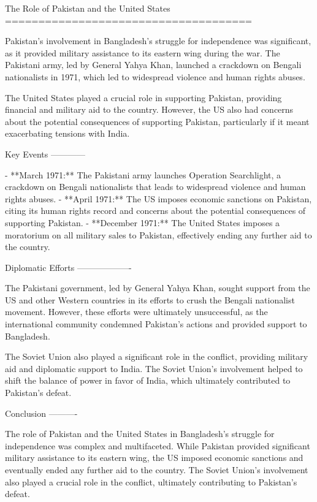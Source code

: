 The Role of Pakistan and the United States
=====================================

Pakistan's involvement in Bangladesh's struggle for independence was significant, as it provided military assistance to its eastern wing during the war. The Pakistani army, led by General Yahya Khan, launched a crackdown on Bengali nationalists in 1971, which led to widespread violence and human rights abuses.

The United States played a crucial role in supporting Pakistan, providing financial and military aid to the country. However, the US also had concerns about the potential consequences of supporting Pakistan, particularly if it meant exacerbating tensions with India.

Key Events
------------

- **March 1971:** The Pakistani army launches Operation Searchlight, a crackdown on Bengali nationalists that leads to widespread violence and human rights abuses.
- **April 1971:** The US imposes economic sanctions on Pakistan, citing its human rights record and concerns about the potential consequences of supporting Pakistan.
- **December 1971:** The United States imposes a moratorium on all military sales to Pakistan, effectively ending any further aid to the country.

Diplomatic Efforts
-------------------

The Pakistani government, led by General Yahya Khan, sought support from the US and other Western countries in its efforts to crush the Bengali nationalist movement. However, these efforts were ultimately unsuccessful, as the international community condemned Pakistan's actions and provided support to Bangladesh.

The Soviet Union also played a significant role in the conflict, providing military aid and diplomatic support to India. The Soviet Union's involvement helped to shift the balance of power in favor of India, which ultimately contributed to Pakistan's defeat.

Conclusion
----------

The role of Pakistan and the United States in Bangladesh's struggle for independence was complex and multifaceted. While Pakistan provided significant military assistance to its eastern wing, the US imposed economic sanctions and eventually ended any further aid to the country. The Soviet Union's involvement also played a crucial role in the conflict, ultimately contributing to Pakistan's defeat.